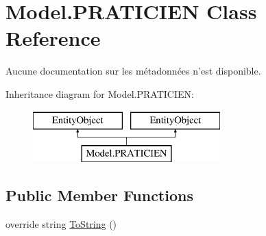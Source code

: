 \hypertarget{class_model_1_1_p_r_a_t_i_c_i_e_n}{\section{Model.\-P\-R\-A\-T\-I\-C\-I\-E\-N Class Reference}
\label{class_model_1_1_p_r_a_t_i_c_i_e_n}
}


Aucune documentation sur les métadonnées n'est disponible.  


Inheritance diagram for Model.\-P\-R\-A\-T\-I\-C\-I\-E\-N\-:\begin{figure}[H]
\begin{center}
\leavevmode
\includegraphics[height=2.000000cm]{class_model_1_1_p_r_a_t_i_c_i_e_n}
\end{center}
\end{figure}
\subsection*{Public Member Functions}
\begin{DoxyCompactItemize}
\item 
override string \hyperlink{class_model_1_1_p_r_a_t_i_c_i_e_n_ac980c0c57fc1a58f8681bd6590f099a2}{To\-String} ()
\end{DoxyCompactItemize}
